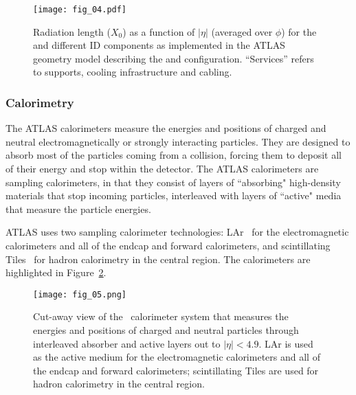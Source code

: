 \documentclass[cernpreprint, atlasdraft=false, UKenglish,british,orcidlogo, texmf, orcidlogo]{atlasdoc}
\begin{document}
\begin{figure}[t]
\centerline{\texttt{[image: fig\_04.pdf]}}
\caption{Radiation length ($X_0$) as a function of $|\eta|$ (averaged over $\phi$) for the \beampipe and different \gls{ID} components as implemented in the ATLAS geometry model describing the \RunTwo and \RunThr configuration. ``Services'' refers to supports, cooling infrastructure and cabling.
\label{fig:Overview:material}}      
\end{figure}
 
\subsubsection{Calorimetry}
 
The ATLAS calorimeters measure the energies and positions of charged and neutral electromagnetically or strongly interacting particles. They are designed to absorb most of the particles coming from a collision, forcing them to deposit all of their energy and stop within the detector. The ATLAS calorimeters are sampling calorimeters, in that they consist of layers of ``absorbing" high-density materials that stop incoming particles, interleaved with layers of ``active" media that measure the particle energies.
 
ATLAS uses two sampling calorimeter technologies: \gls{LAr}~\cite{ATLAS-TDR-02} for the electromagnetic calorimeters and all of the endcap and forward calorimeters, and scintillating Tiles~\cite{ATLAS-TDR-03} for hadron calorimetry in the central region. The calorimeters are highlighted in Figure~\ref{fig:Overview:calos}.
 
\begin{figure}[t]
\centerline{\texttt{[image: fig\_05.png]}}
\caption{Cut-away view of the \ATLAS\ calorimeter system that measures the energies and positions of charged and neutral particles through interleaved absorber and active layers out to $|\eta| < 4.9$. \gls{LAr} is used as the active medium for the electromagnetic calorimeters and all of the endcap and forward calorimeters; scintillating Tiles are used for hadron calorimetry in the central region.\label{fig:Overview:calos} }
\end{figure}
 
\end{document}
